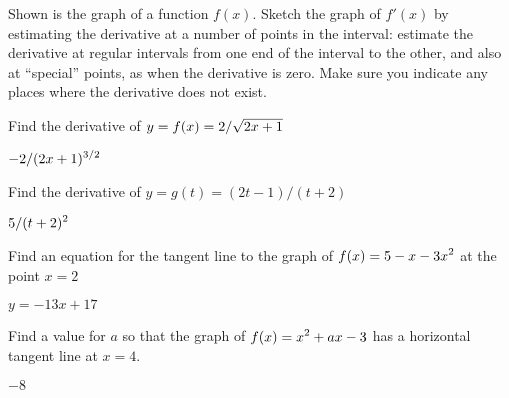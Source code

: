 \begin{exercises}
\exercise
Shown is the graph of a function $f(x)$. Sketch the graph of $f'(x)$
by estimating the derivative at a number of points in the interval:
estimate the derivative at regular intervals from one end of the
interval to the other, and also at ``special'' points, as when the
derivative is zero. Make sure you indicate any places where the
derivative does not exist.


\end{exercises}
\exercise
Find the derivative of $\displaystyle y=f(x)=2/\sqrt{2x+1}$ 
\begin{answer} $\displaystyle -2/(2x+1)^{3/2}$
\end{answer}

\exercise
Find the derivative of $y=g(t)=(2t-1)/(t+2)$
\begin{answer} $\displaystyle 5/(t+2)^2$
\end{answer}

\exercise
Find an equation for the tangent line to the graph of $\displaystyle f(x)=5-x-3x^2$ at the point $x=2$
\begin{answer} $y=-13x+17$
\end{answer}

\exercise
Find a value for $a$ so that the graph of $\displaystyle f(x)=x^2+ax-3$ has a horizontal tangent line at $x=4$.
\begin{answer} $-8$
\end{answer}


